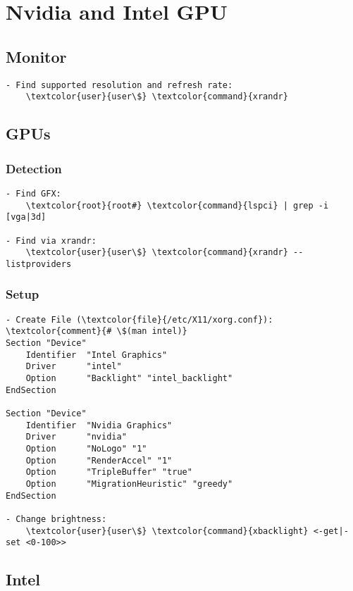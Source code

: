 \documentclass[10pt, a4paper, onecolumn, openany]{book} %
\begin{document}
\chapter{Nvidia and Intel GPU}
\section{Monitor}
\begin{Verbatim}[commandchars=\\\{\}]
- Find supported resolution and refresh rate:
    \textcolor{user}{user\$} \textcolor{command}{xrandr}
\end{Verbatim}

\section{GPUs}
\subsection{Detection}
\begin{Verbatim}[commandchars=\\\{\}]
- Find GFX:
    \textcolor{root}{root#} \textcolor{command}{lspci} | grep -i [vga|3d]
    
- Find via xrandr:
    \textcolor{user}{user\$} \textcolor{command}{xrandr} --listproviders
\end{Verbatim}
\subsection{Setup}
\begin{Verbatim}[commandchars=\\\{\}]
- Create File (\textcolor{file}{/etc/X11/xorg.conf}):
\textcolor{comment}{# \$(man intel)}
Section "Device"
    Identifier  "Intel Graphics"
    Driver      "intel"
    Option      "Backlight" "intel_backlight"
EndSection

Section "Device"
    Identifier  "Nvidia Graphics"
    Driver      "nvidia"
    Option      "NoLogo" "1"
    Option      "RenderAccel" "1"
    Option      "TripleBuffer" "true"
    Option      "MigrationHeuristic" "greedy"
EndSection

- Change brightness:
    \textcolor{user}{user\$} \textcolor{command}{xbacklight} <-get|-set <0-100>>
\end{Verbatim}

\section{Intel}
\end{document}
